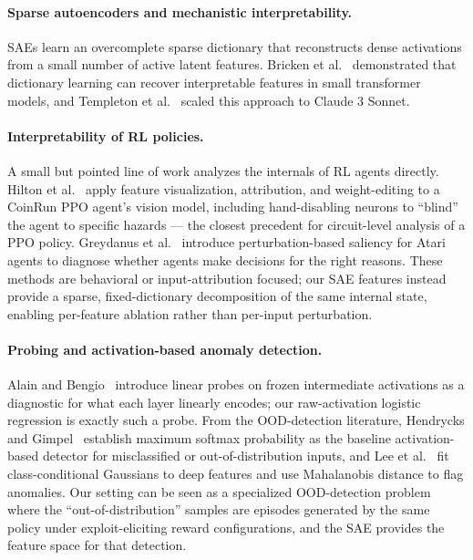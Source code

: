 \documentclass[11pt]{article}
\begin{document}
\paragraph{Sparse autoencoders and mechanistic interpretability.}
SAEs learn an overcomplete sparse dictionary that reconstructs dense activations from a small number of active latent features. Bricken et al.~\cite{bricken2023monosemanticity} demonstrated that dictionary learning can recover interpretable features in small transformer models, and Templeton et al.~\cite{templeton2024scaling} scaled this approach to Claude 3 Sonnet.

\paragraph{Interpretability of RL policies.}
A small but pointed line of work analyzes the internals of RL agents directly. Hilton et al.~\cite{hilton2020understandingrl} apply feature visualization, attribution, and weight-editing to a CoinRun PPO agent's vision model, including hand-disabling neurons to ``blind'' the agent to specific hazards --- the closest precedent for circuit-level analysis of a PPO policy. Greydanus et al.~\cite{greydanus2018visualizingatari} introduce perturbation-based saliency for Atari agents to diagnose whether agents make decisions for the right reasons. These methods are behavioral or input-attribution focused; our SAE features instead provide a sparse, fixed-dictionary decomposition of the same internal state, enabling per-feature ablation rather than per-input perturbation.

\paragraph{Probing and activation-based anomaly detection.}
Alain and Bengio~\cite{alain2016probes} introduce linear probes on frozen intermediate activations as a diagnostic for what each layer linearly encodes; our raw-activation logistic regression is exactly such a probe. From the OOD-detection literature, Hendrycks and Gimpel~\cite{hendrycks2017softmaxbaseline} establish maximum softmax probability as the baseline activation-based detector for misclassified or out-of-distribution inputs, and Lee et al.~\cite{lee2018mahalanobis} fit class-conditional Gaussians to deep features and use Mahalanobis distance to flag anomalies. Our setting can be seen as a specialized OOD-detection problem where the ``out-of-distribution'' samples are episodes generated by the same policy under exploit-eliciting reward configurations, and the SAE provides the feature space for that detection.
\end{document}

